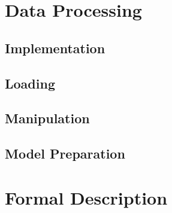 \section{Data Processing}
    
        \subsection{Implementation}
        
        \subsection{Loading}
        
        \subsection{Manipulation}
        
        \subsection{Model Preparation}
        
    \section{Formal Description}
    
